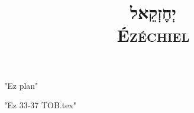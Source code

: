 \documentclass[12pt,a4paper,titlepage]{article}
\title{\fontsize{50}{60}\selectfont \texthebrew{יְחֶזְקֵאל}\\
\fontsize{40}{50}\selectfont \textsc{Ézéchiel} }
\date{}
\begin{document}
\maketitle
\vfill

\newpage 


\newpage 
 {"Ez plan"}
\newpage

\newpage

\newpage

\vfill

\newpage
 {"Ez 33-37 TOB.tex"}
\end{document}
